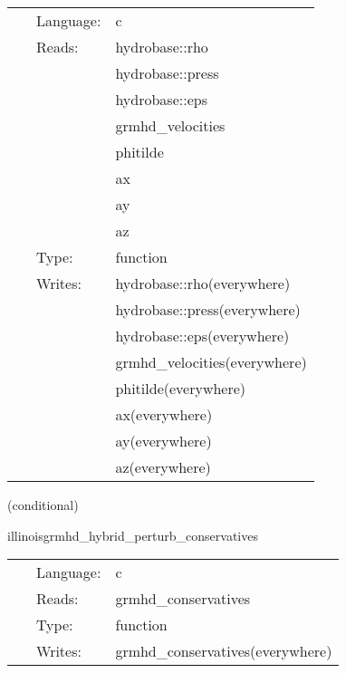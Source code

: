 \hspace{5mm}

 \begin{tabular*}{160mm}{cll} 
~ & Language:  & c \\ 
~ & Reads:  & hydrobase::rho \\ 
~& ~ &hydrobase::press\\ 
~& ~ &hydrobase::eps\\ 
~& ~ &grmhd\_velocities\\ 
~& ~ &phitilde\\ 
~& ~ &ax\\ 
~& ~ &ay\\ 
~& ~ &az\\ 
~ & Type:  & function \\ 
~ & Writes:  & hydrobase::rho(everywhere) \\ 
~& ~ &hydrobase::press(everywhere)\\ 
~& ~ &hydrobase::eps(everywhere)\\ 
~& ~ &grmhd\_velocities(everywhere)\\ 
~& ~ &phitilde(everywhere)\\ 
~& ~ &ax(everywhere)\\ 
~& ~ &ay(everywhere)\\ 
~& ~ &az(everywhere)\\ 
\end{tabular*} 


\vspace{5mm}

   (conditional) 

\hspace{5mm} illinoisgrmhd\_hybrid\_perturb\_conservatives 

\hspace{5mm}{\it hybrid version of illinoisgrmhd\_perturb\_conservatives } 


\hspace{5mm}

 \begin{tabular*}{160mm}{cll} 
~ & Language:  & c \\ 
~ & Reads:  & grmhd\_conservatives \\ 
~ & Type:  & function \\ 
~ & Writes:  & grmhd\_conservatives(everywhere) \\ 
\end{tabular*} 


\vspace{5mm}

